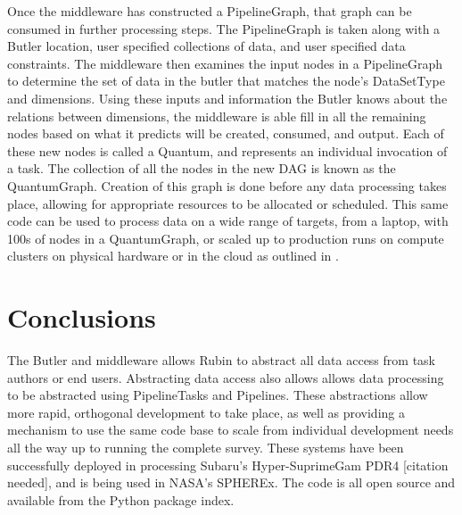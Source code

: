 Once the middleware has constructed a PipelineGraph, that graph can be consumed in further processing steps. The PipelineGraph is taken along with a Butler location, user specified collections of data, and user specified data constraints.  The middleware then examines the input nodes in a PipelineGraph to determine the set of data in the butler that matches the node's DataSetType and dimensions. Using these inputs and information the Butler knows about the relations between dimensions, the middleware is able fill in all the remaining nodes based on what it predicts will be created, consumed, and output. Each of these new nodes is called a Quantum, and represents an individual invocation of a task. The collection of all the nodes in the new DAG is known as the QuantumGraph. Creation of this graph is done before any data processing takes place, allowing for appropriate resources to be allocated or scheduled. This same code can be used to process data on a wide range of targets, from a laptop, with 100s of nodes in a QuantumGraph, or scaled up to production runs on compute clusters on physical hardware or in the cloud as outlined in \citet{P52_adassxxxii}.

\section{Conclusions}
The Butler and middleware allows Rubin to abstract all data access from task authors or end users. Abstracting data access also allows allows data processing to be abstracted using PipelineTasks and Pipelines. These abstractions allow more rapid, orthogonal development to take place, as well as providing a mechanism to use the same code base to scale from individual development needs all the way up to running the complete survey. These systems have been successfully deployed in processing Subaru's Hyper-SuprimeGam PDR4 [citation needed], and is being used in NASA's SPHEREx. The code is all open source and available from the Python package index.

\vskip 0.4in